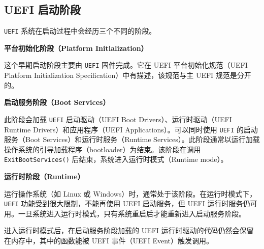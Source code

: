\subsection{UEFI 启动阶段}

\texttt{UEFI} 系统在启动过程中会经历三个不同的阶段。

\textbf{平台初始化阶段（Platform Initialization）}

这个早期启动阶段主要由 \texttt{UEFI} 固件完成。它在 UEFI 平台初始化规范（UEFI Platform Initialization Specification）中有描述，该规范与主 UEFI 规范是分开的。

\textbf{启动服务阶段（Boot Services）}

此阶段会加载 \texttt{UEFI} 启动驱动（UEFI Boot Drivers）、运行时驱动（UEFI Runtime Drivers）和应用程序（UEFI Applications）。可以同时使用 \texttt{UEFI} 的启动服务（Boot Services）和运行时服务（Runtime Services）。此阶段通常以运行加载操作系统的引导加载程序（bootloader）为结束。该阶段在调用 \texttt{ExitBootServices()} 后结束，系统进入运行时模式（Runtime mode）。

\textbf{运行时阶段（Runtime）}

运行操作系统（如 Linux 或 Windows）时，通常处于该阶段。在运行时模式下，\texttt{UEFI} 功能受到很大限制，不能再使用 UEFI 启动服务，但 UEFI 运行时服务仍可用。一旦系统进入运行时模式，只有系统重启后才能重新进入启动服务阶段。

进入运行时模式后，在启动服务阶段加载的 UEFI 运行时驱动的代码仍然会保留在内存中，其中的函数能被 UEFI 事件（UEFI Event）触发调用。